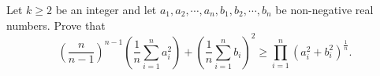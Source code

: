 Let $k\ge 2$ be an integer and let $a_1 ,a_2 ,\cdots ,a_n,b_1 ,b_2 ,\cdots ,b_n$ be non-negative real numbers. Prove that\[\left(\frac{n}{n-1}\right)^{n-1}\left(\frac{1}{n} \sum_{i=1}^{n} a_i^2\right)+\left(\frac{1}{n} \sum_{i=1}^{n} b_i\right)^2\ge\prod_{i=1}^{n}(a_i^{2}+b_i^{2})^{\frac{1}{n}}.\]